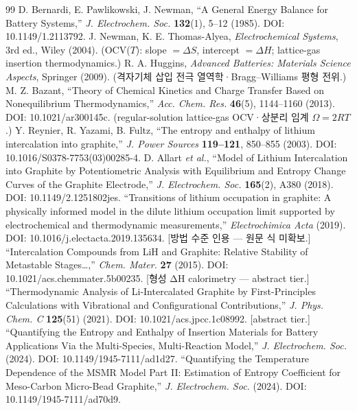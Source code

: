 \documentclass[11pt,a4paper]{article}
\begin{document}
\begin{thebibliography}{99}
 D. Bernardi, E. Pawlikowski, J. Newman, ``A General Energy Balance for Battery Systems,'' \emph{J. Electrochem. Soc.} \textbf{132}(1), 5--12 (1985). DOI: 10.1149/1.2113792.
 J. Newman, K. E. Thomas-Alyea, \emph{Electrochemical Systems}, 3rd ed., Wiley (2004). (OCV($T$): slope $=\Delta S$, intercept $=\Delta H$; lattice-gas insertion thermodynamics.)
 R. A. Huggins, \emph{Advanced Batteries: Materials Science Aspects}, Springer (2009). (격자기체 삽입 전극 열역학·Bragg--Williams 평형 전위.)
 M. Z. Bazant, ``Theory of Chemical Kinetics and Charge Transfer Based on Nonequilibrium Thermodynamics,'' \emph{Acc. Chem. Res.} \textbf{46}(5), 1144--1160 (2013). DOI: 10.1021/ar300145c. (regular-solution lattice-gas OCV·상분리 임계 $\Omega=2RT$.)
 Y. Reynier, R. Yazami, B. Fultz, ``The entropy and enthalpy of lithium intercalation into graphite,'' \emph{J. Power Sources} \textbf{119--121}, 850--855 (2003). DOI: 10.1016/S0378-7753(03)00285-4.
 D. Allart \emph{et al.}, ``Model of Lithium Intercalation into Graphite by Potentiometric Analysis with Equilibrium and Entropy Change Curves of the Graphite Electrode,'' \emph{J. Electrochem. Soc.} \textbf{165}(2), A380 (2018). DOI: 10.1149/2.1251802jes.
 ``Transitions of lithium occupation in graphite: A physically informed model in the dilute lithium occupation limit supported by electrochemical and thermodynamic measurements,'' \emph{Electrochimica Acta} (2019). DOI: 10.1016/j.electacta.2019.135634. [방법 수준 인용 — 원문 식 미확보.]
 ``Intercalation Compounds from LiH and Graphite: Relative Stability of Metastable Stages\ldots,'' \emph{Chem. Mater.} \textbf{27} (2015). DOI: 10.1021/acs.chemmater.5b00235. [형성 ΔH calorimetry — abstract tier.]
 ``Thermodynamic Analysis of Li-Intercalated Graphite by First-Principles Calculations with Vibrational and Configurational Contributions,'' \emph{J. Phys. Chem. C} \textbf{125}(51) (2021). DOI: 10.1021/acs.jpcc.1c08992. [abstract tier.]
 ``Quantifying the Entropy and Enthalpy of Insertion Materials for Battery Applications Via the Multi-Species, Multi-Reaction Model,'' \emph{J. Electrochem. Soc.} (2024). DOI: 10.1149/1945-7111/ad1d27.
 ``Quantifying the Temperature Dependence of the MSMR Model Part II: Estimation of Entropy Coefficient for Meso-Carbon Micro-Bead Graphite,'' \emph{J. Electrochem. Soc.} (2024). DOI: 10.1149/1945-7111/ad70d9.

\end{thebibliography}
\end{document}
